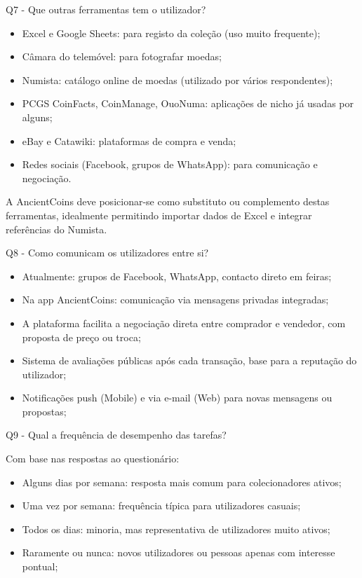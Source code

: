 \documentclass[12pt,a4paper]{article}
\begin{document}
Q7 - Que outras ferramentas tem o utilizador?

\begin{itemize}
\setlength{\itemsep}{0.15em}
\item Excel e Google Sheets: para registo da coleção (uso muito frequente);
\item Câmara do telemóvel: para fotografar moedas;
\item Numista: catálogo online de moedas (utilizado por vários respondentes);
\item PCGS CoinFacts, CoinManage, OuoNuma: aplicações de nicho já usadas por alguns;
\item eBay e Catawiki: plataformas de compra e venda;
\item Redes sociais (Facebook, grupos de WhatsApp): para comunicação e negociação.
\end{itemize}

A AncientCoins deve posicionar-se como substituto ou complemento destas ferramentas, idealmente permitindo importar dados de Excel e integrar referências do Numista.

Q8 - Como comunicam os utilizadores entre si?

\begin{itemize}
\setlength{\itemsep}{0.15em}
\item Atualmente: grupos de Facebook, WhatsApp, contacto direto em feiras;
\item Na app AncientCoins: comunicação via mensagens privadas integradas;
\item A plataforma facilita a negociação direta entre comprador e vendedor, com proposta de preço ou troca;
\item Sistema de avaliações públicas após cada transação, base para a reputação do utilizador;
\item Notificações push (Mobile) e via e-mail (Web) para novas mensagens ou propostas;
\end{itemize}

Q9 - Qual a frequência de desempenho das tarefas?

Com base nas respostas ao questionário:

\begin{itemize}
\setlength{\itemsep}{0.15em}
\item Alguns dias por semana: resposta mais comum para colecionadores ativos;
\item Uma vez por semana: frequência típica para utilizadores casuais;
\item Todos os dias: minoria, mas representativa de utilizadores muito ativos;
\item Raramente ou nunca: novos utilizadores ou pessoas apenas com interesse pontual;
\end{itemize}
\end{document}
